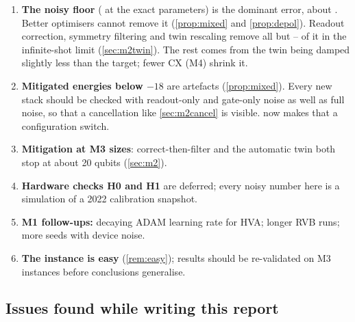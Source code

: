 \begin{enumerate}
  \item \textbf{The noisy floor} (\VFloorHvaFull{} at the exact parameters) is the dominant
    error, about \VPostErrHvaSpsa. Better optimisers cannot remove it (\cref{prop:mixed} and \cref{prop:depol}).
    Readout correction, symmetry filtering and twin rescaling remove all but
    \VMxTwMin--\VMxTwMax{} of it in the infinite-shot limit (\cref{sec:m2twin}). The rest comes
    from the twin being damped slightly less than the target; fewer CX (M4) shrink it.
  \item \textbf{Mitigated energies below $-18$} are artefacts (\cref{prop:mixed}). Every new stack
    should be checked with readout-only and gate-only noise as well as full noise, so that a
    cancellation like \cref{sec:m2cancel} is visible.  now makes that a
    configuration switch.
  \item \textbf{Mitigation at M3 sizes}: correct-then-filter and the automatic twin both stop at
    about 20 qubits (\cref{sec:m2}).
  \item \textbf{Hardware checks H0 and H1} are deferred; every noisy number here is a simulation of
    a 2022 calibration snapshot.
  \item \textbf{M1 follow-ups:} decaying ADAM learning rate for HVA; longer RVB runs; more seeds
    with device noise.
  \item \textbf{The instance is easy} (\cref{rem:easy}); results should be re-validated on M3
    instances before conclusions generalise.
\end{enumerate}

\subsection{Issues found while writing this report}

